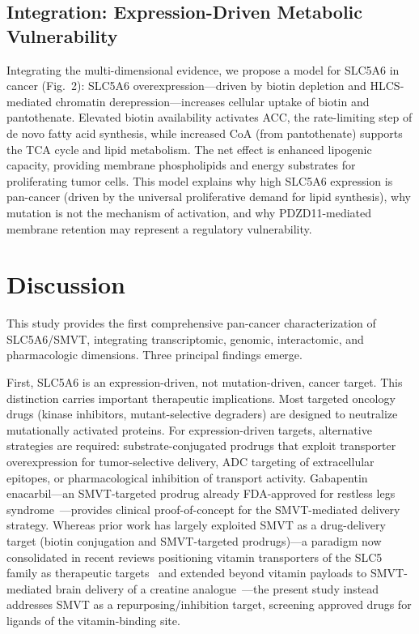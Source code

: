 \documentclass[pdflatex,sn-nature]{sn-jnl}
\begin{document}
\subsection*{Integration: Expression-Driven Metabolic Vulnerability}

Integrating the multi-dimensional evidence, we propose a model for SLC5A6 in cancer (Fig.~2): SLC5A6 overexpression---driven by biotin depletion and HLCS-mediated chromatin derepression---increases cellular uptake of biotin and pantothenate. Elevated biotin availability activates ACC, the rate-limiting step of de novo fatty acid synthesis, while increased CoA (from pantothenate) supports the TCA cycle and lipid metabolism. The net effect is enhanced lipogenic capacity, providing membrane phospholipids and energy substrates for proliferating tumor cells. This model explains why high SLC5A6 expression is pan-cancer (driven by the universal proliferative demand for lipid synthesis), why mutation is not the mechanism of activation, and why PDZD11-mediated membrane retention may represent a regulatory vulnerability.


\section*{Discussion}

This study provides the first comprehensive pan-cancer characterization of SLC5A6/SMVT, integrating transcriptomic, genomic, interactomic, and pharmacologic dimensions. Three principal findings emerge.

\noindent First, SLC5A6 is an expression-driven, not mutation-driven, cancer target. This distinction carries important therapeutic implications. Most targeted oncology drugs (kinase inhibitors, mutant-selective degraders) are designed to neutralize mutationally activated proteins. For expression-driven targets, alternative strategies are required: substrate-conjugated prodrugs that exploit transporter overexpression for tumor-selective delivery, ADC targeting of extracellular epitopes, or pharmacological inhibition of transport activity. Gabapentin enacarbil---an SMVT-targeted prodrug already FDA-approved for restless legs syndrome~\cite{cundy2004}---provides clinical proof-of-concept for the SMVT-mediated delivery strategy. Whereas prior work has largely exploited SMVT as a drug-delivery target (biotin conjugation and SMVT-targeted prodrugs)---a paradigm now consolidated in recent reviews positioning vitamin transporters of the SLC5 family as therapeutic targets~\cite{yuan2025} and extended beyond vitamin payloads to SMVT-mediated brain delivery of a creatine analogue~\cite{kralova2026}---the present study instead addresses SMVT as a repurposing/inhibition target, screening approved drugs for ligands of the vitamin-binding site.
\end{document}
